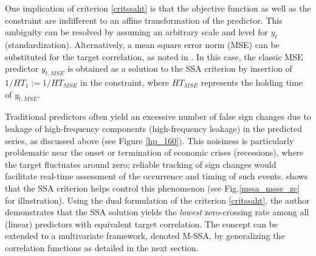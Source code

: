 \documentclass[11pt,a4paper]{article}
\begin{document}
One implication of criterion \eqref{critssaht} is that the objective function as well as the constraint are indifferent to an affine transformation of the predictor. This ambiguity can be resolved by assuming an arbitrary scale and level for $y_t$ (standardization). Alternatively, a mean square error norm (MSE) can be substituted for the target correlation, as noted in \cite{Wildi2025}. In this case, the classic MSE predictor $y_{t,MSE}$ is obtained as a solution to the SSA criterion by insertion of $1/HT_1:=1/HT_{MSE}$ in the constraint, where $HT_{MSE}$ represents the holding time of $y_{t,MSE}$. %

Traditional predictors often yield an excessive number of false sign changes due to leakage of high-frequency components (high-frequency leakage) in the predicted series, as discussed above (see Figure \eqref{hp_160}). This noisiness is particularly problematic near the onset or termination of economic crises (recessions), where the target fluctuates around zero; reliable tracking of sign changes would facilitate real-time assessment of the occurrence and timing of such events. 
 \cite{Wildi2025} shows that the SSA criterion helps control this phenomenon (see Fig.\eqref{mssa_msse_zc} for illustration). Using the dual formulation of the criterion \eqref{critssaht}, the author demonstrates that the SSA solution yields the \emph{lowest} zero-crossing rate among all (linear) predictors with equivalent target correlation.
The concept can be extended to a multivariate framework, denoted M-SSA, by generalizing the correlation functions as detailed in the next section.\\
\end{document}
